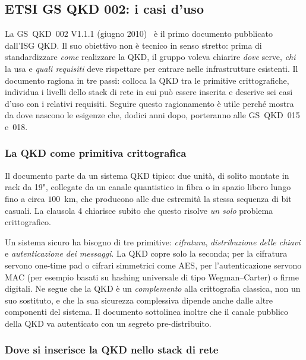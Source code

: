\subsection{ETSI GS QKD 002: i casi d'uso}
\label{sec:qkd002}

La GS~QKD~002 V1.1.1 (giugno 2010)~\cite{qkd002} è il primo documento
pubblicato dall'ISG QKD. Il suo obiettivo non è tecnico in senso stretto:
prima di standardizzare \emph{come} realizzare la QKD, il gruppo voleva
chiarire \emph{dove} serve, \emph{chi} la usa e \emph{quali requisiti}
deve rispettare per entrare nelle infrastrutture esistenti. Il documento
ragiona in tre passi: colloca la QKD tra le primitive crittografiche,
individua i livelli dello stack di rete in cui può essere inserita e
descrive sei casi d'uso con i relativi requisiti. Seguire questo
ragionamento è utile perché mostra da dove nascono le esigenze che, dodici
anni dopo, porteranno alle GS~QKD~015 e~018.

\subsubsection{La QKD come primitiva crittografica}

Il documento parte da un sistema QKD tipico: due unità, di solito montate
in rack da 19", collegate da un canale quantistico in fibra o in spazio
libero lungo fino a circa $100$~km, che producono alle due estremità la
stessa sequenza di bit casuali. La clausola 4 chiarisce subito che questo
risolve \emph{un solo} problema crittografico.

Un sistema sicuro ha bisogno di tre primitive: \emph{cifratura},
\emph{distribuzione delle chiavi} e \emph{autenticazione dei messaggi}. La
QKD copre solo la seconda; per la cifratura servono one-time pad o cifrari
simmetrici come AES, per l'autenticazione servono MAC (per esempio basati
su hashing universale di tipo Wegman–Carter) o firme digitali. Ne segue che
la QKD è un \emph{complemento} alla crittografia classica, non un suo
sostituto, e che la sua sicurezza complessiva dipende anche dalle altre
componenti del sistema. Il documento sottolinea inoltre che il canale
pubblico della QKD va autenticato con un segreto pre-distribuito.

\subsubsection{Dove si inserisce la QKD nello stack di rete}

